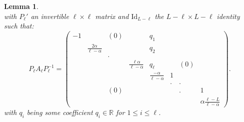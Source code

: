 \documentclass[11pt,a4paper,reqno]{amsart}
\newtheorem{lemma}[theorem]{Lemma}
\theoremstyle{remark}
\numberwithin{equation}{section}
\begin{document}
\begin{lemma}
\begin{equation}
\end{equation}
with $P_{\ell}'$ an invertible $\ell \times \ell$ matrix and $\text{Id}_{L-\ell}$ the $L-\ell\times L-\ell$ identity such that:
\begin{equation} \label{linearized:eq:diagonalisation}
P_{\ell}A_{\ell}P_{\ell}^{-1}=\begin{pmatrix} -1 &  & (0)  & & q_1 & & &  \\  & \frac{2\alpha}{\ell-\alpha} &  &  & q_2 & & &  \\  & & . &  & & & &  \\  &  & & \frac{\ell \alpha}{\ell-\alpha} &  q_{\ell} & &  (0) &  \\  & & & & \frac{-\alpha}{\ell-\alpha} & 1 & &  \\   & & & & & . & . &  \\  & & (0) & & & & .& 1   \\  & &  & & & &  & \alpha\frac{\ell-L}{\ell-\alpha}  \end{pmatrix}.
\end{equation}
with $q_i$ being some coefficient $q_i\in \mathbb{R}$ for $1\leq i \leq \ell$.
\end{lemma}
\end{document}
